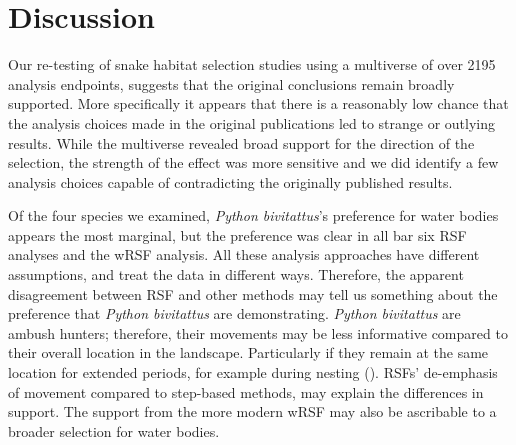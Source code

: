 \documentclass[10pt,a4paper]{article}
\begin{document}
\section{Discussion}\label{discussion}

Our re-testing of snake habitat selection studies using a multiverse of over 2195 analysis endpoints, suggests that the original conclusions remain broadly supported.
More specifically it appears that there is a reasonably low chance that the analysis choices made in the original publications led to strange or outlying results.
While the multiverse revealed broad support for the direction of the selection, the strength of the effect was more sensitive and we did identify a few analysis choices capable of contradicting the originally published results.

Of the four species we examined, \emph{Python bivitattus}'s preference for water bodies appears the most marginal, but the preference was clear in all bar six RSF analyses and the wRSF analysis.
All these analysis approaches have different assumptions, and treat the data in different ways.
Therefore, the apparent disagreement between RSF and other methods may tell us something about the preference that \emph{Python bivitattus} are demonstrating.
\emph{Python bivitattus} are ambush hunters; therefore, their movements may be less informative compared to their overall location in the landscape.
Particularly if they remain at the same location for extended periods, for example during nesting ().
RSFs' de-emphasis of movement compared to step-based methods, may explain the differences in support.
The support from the more modern wRSF may also be ascribable to a broader selection for water bodies.
\end{document}
